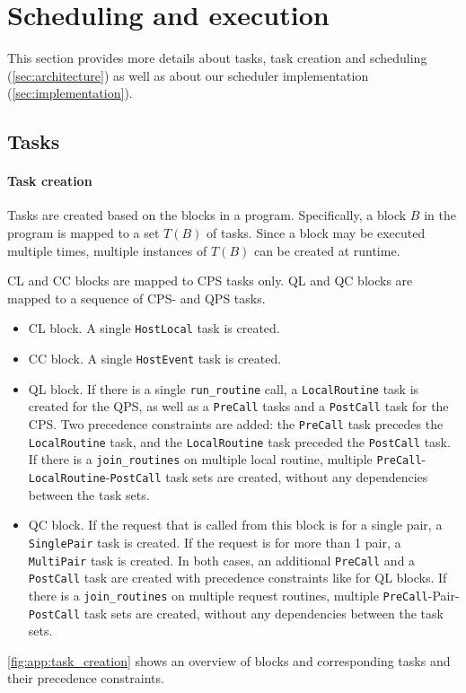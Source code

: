 \section{Scheduling and execution}
\label{app:scheduling_execution}
This section provides more details about tasks, task creation and scheduling (\cref{sec:architecture}) as well as about our scheduler implementation (\cref{sec:implementation}).

\subsection{Tasks}
\label{app:scheduling_tasks}

\paragraph{Task creation}

Tasks are created based on the blocks in a program.
Specifically, a block $B$ in the program is mapped to a set $T(B)$ of tasks.
Since a block may be executed multiple times, multiple instances of $T(B)$ can be created at runtime.

CL and CC blocks are mapped to CPS tasks only.
QL and QC blocks are mapped to a sequence of CPS- and QPS tasks.
\begin{itemize}
    \item CL block. A single \texttt{HostLocal} task is created.
    \item CC block. A single \texttt{HostEvent} task is created.
    \item QL block. If there is a single \texttt{run\_routine} call, a \texttt{LocalRoutine} task is created for the QPS, as well as a \texttt{PreCall} tasks and a \texttt{PostCall} task for the CPS.
    Two precedence constraints are added: the \texttt{PreCall} task precedes the \texttt{LocalRoutine} task, and the \texttt{LocalRoutine} task preceded the \texttt{PostCall} task.
    If there is a \texttt{join\_routines} on multiple local routine, multiple \texttt{PreCall}-\texttt{LocalRoutine}-\texttt{PostCall} task sets are created, without any dependencies between the task sets.
    \item QC block. If the request that is called from this block is for a single pair,
    a \texttt{SinglePair} task is created. If the request is for more than 1 pair, a \texttt{MultiPair} task is created. In both cases, an additional \texttt{PreCall} and a \texttt{PostCall} task are created with precedence constraints like for QL blocks.
    If there is a \texttt{join\_routines} on multiple request routines, multiple \texttt{PreCall}-Pair-\texttt{PostCall} task sets are created, without any dependencies between the task sets.
\end{itemize}
\cref{fig:app:task_creation} shows an overview of blocks and corresponding tasks and their precedence constraints.


